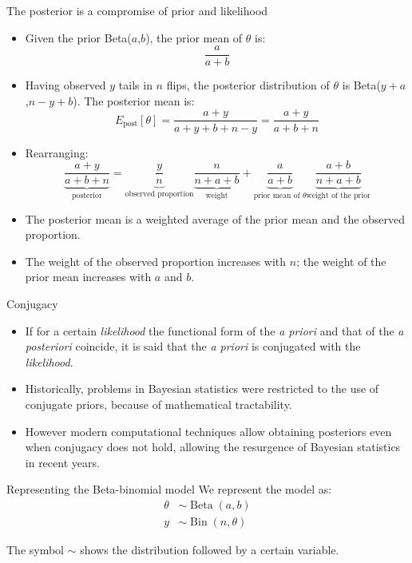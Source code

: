 \documentclass[
  13pt,
  ignorenonframetext,
]{beamer}
\begin{document}
\begin{frame}{The posterior is a compromise of prior and likelihood}
\protect\hypertarget{the-posterior-is-a-compromise-of-prior-and-likelihood}{}
\begin{itemize}
\item
  Given the prior Beta(\(a\),\(b\)), the prior mean of \(\theta\) is:
  \[\frac{a}{a+b}\]
\item
  Having observed \(y\) tails in \(n\) flips, the posterior distribution
  of \(\theta\) is Beta(\(y+a\),\(n-y+b\)). The posterior mean is:
  \[E_{\text{post}}[\theta]=\frac{a + y}{a + y + b + n - y} = \frac{a + y}{a+ b + n} \]
\item
  Rearranging: \[ 
  \underbrace{\frac{a + y}{a+ b + n}}_{\text{posterior}} = 
  \underbrace{\frac{y}{n}}_{\text{observed proportion}}
  \underbrace{\frac{n}{n+a+b}}_{\text{weight}} + 
  \underbrace{\frac{a}{a+b}}_{\text{prior mean of $\theta$}}
  \underbrace{\frac{a+b}{n+a+b}}_{\text{weight of the prior}}  
  \]
\item
  The posterior mean is a weighted average of the prior mean and the
  observed proportion.
\item
  The weight of the observed proportion increases with \(n\); the weight
  of the prior mean increases with \(a\) and \(b\).
\end{itemize}
\end{frame}

\begin{frame}{Conjugacy}
\protect\hypertarget{conjugacy-1}{}
\begin{itemize}
\item
  If for a certain \emph{likelihood} the functional form of the \emph{a
  priori} and that of the \emph{a posteriori} coincide, it is said that
  the \emph{a priori} is conjugated with the \emph{likelihood}.
\item
  Historically, problems in Bayesian statistics were restricted to the
  use of conjugate priors, because of mathematical tractability.
\item
  However modern computational techniques allow obtaining posteriors
  even when conjugacy does not hold, allowing the resurgence of Bayesian
  statistics in recent years.
\end{itemize}
\end{frame}

\begin{frame}{Representing the Beta-binomial model}
\protect\hypertarget{representing-the-beta-binomial-model}{}
We represent the model as: \begin{align*}
\theta & \sim \operatorname{Beta}(a,b)\\
y & \sim \operatorname{Bin}(n,\theta)
\end{align*}

The symbol \(\sim\) shows the distribution followed by a certain
variable.
\end{frame}
\end{document}
